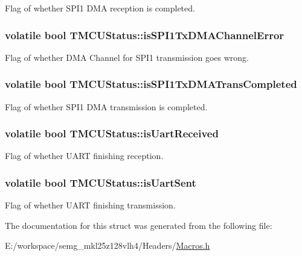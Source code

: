 Flag of whether S\-P\-I1 D\-M\-A reception is completed. \hypertarget{struct_t_m_c_u_status_a8ae581353ceb6e9ef96799da069fb22c}{
\subsubsection[{is\-S\-P\-I1\-Tx\-D\-M\-A\-Channel\-Error}]{\setlength{\rightskip}{0pt plus 5cm}volatile bool T\-M\-C\-U\-Status\-::is\-S\-P\-I1\-Tx\-D\-M\-A\-Channel\-Error}}\label{struct_t_m_c_u_status_a8ae581353ceb6e9ef96799da069fb22c}
Flag of whether D\-M\-A Channel for S\-P\-I1 transmission goes wrong. \hypertarget{struct_t_m_c_u_status_ab160f18b2afdcd78e46b3c21c50c62ea}{
\subsubsection[{is\-S\-P\-I1\-Tx\-D\-M\-A\-Trans\-Completed}]{\setlength{\rightskip}{0pt plus 5cm}volatile bool T\-M\-C\-U\-Status\-::is\-S\-P\-I1\-Tx\-D\-M\-A\-Trans\-Completed}}\label{struct_t_m_c_u_status_ab160f18b2afdcd78e46b3c21c50c62ea}
Flag of whether S\-P\-I1 D\-M\-A transmission is completed. \hypertarget{struct_t_m_c_u_status_a1f1b1e5d16e3423b4dccbc2b045da15b}{
\subsubsection[{is\-Uart\-Received}]{\setlength{\rightskip}{0pt plus 5cm}volatile bool T\-M\-C\-U\-Status\-::is\-Uart\-Received}}\label{struct_t_m_c_u_status_a1f1b1e5d16e3423b4dccbc2b045da15b}
Flag of whether U\-A\-R\-T finishing reception. \hypertarget{struct_t_m_c_u_status_a63eaabcf3e40778712ff5d9a92f68366}{
\subsubsection[{is\-Uart\-Sent}]{\setlength{\rightskip}{0pt plus 5cm}volatile bool T\-M\-C\-U\-Status\-::is\-Uart\-Sent}}\label{struct_t_m_c_u_status_a63eaabcf3e40778712ff5d9a92f68366}
Flag of whether U\-A\-R\-T finishing transmission. 

The documentation for this struct was generated from the following file\-:\begin{DoxyCompactItemize}
\item 
E\-:/workspace/semg\-\_\-mkl25z128vlh4/\-Headers/\hyperlink{_macros_8h}{Macros.\-h}\end{DoxyCompactItemize}
